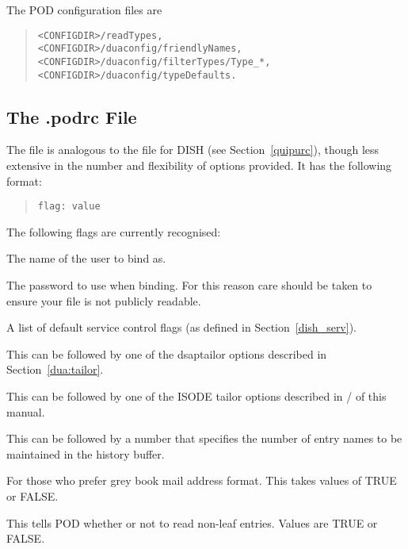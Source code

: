 The POD configuration files are
\begin{quote}\begin{verbatim}
<CONFIGDIR>/readTypes,
<CONFIGDIR>/duaconfig/friendlyNames,
<CONFIGDIR>/duaconfig/filterTypes/Type_*,
<CONFIGDIR>/duaconfig/typeDefaults.
\end{verbatim}\end{quote}

\subsection {The .podrc File}

The  file is analogous to the  file for DISH
(see Section~\ref{quipurc}),
though less extensive in the number and flexibility of options provided.
It has the following format:

\begin{quote}\begin{verbatim}
flag: value
\end{verbatim}\end{quote}

The following flags are currently recognised:

\begin{describe}

\item [\verb+username+:] The name of the user to bind as.

\item [\verb+password+:] The password to use when binding. For this reason care
should be taken to ensure your  file is not publicly readable.

\item [\verb+service+:] A list of default service control flags
(as defined in Section~\ref{dish_serv}).

\item [\verb+dsap+:] This can be followed by one of the dsaptailor options
described in Section~\ref{dua:tailor}.

\item [\verb+isode+:]
This can be followed by one of the ISODE tailor options
described in \volone/ of this manual.

\item [\verb+history+:]
This can be followed by a number that specifies the number of entry names
to be maintained in the history buffer.

\item [\verb+prefergreybook+:]
For those who prefer grey book mail address format.
This takes values of TRUE or FALSE.

\item [\verb+readnonleaf+:]
This tells POD whether or not to read non-leaf entries.
Values are TRUE or FALSE.

\end{describe}

